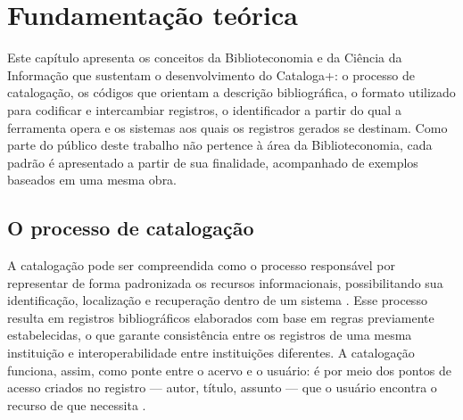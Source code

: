 %
%

\chapter{Fundamentação teórica}
\label{cap:fundamentacao}

Este capítulo apresenta os conceitos da Biblioteconomia e da Ciência da Informação que sustentam o desenvolvimento do Cataloga+: o processo de catalogação, os códigos que orientam a descrição bibliográfica, o formato utilizado para codificar e intercambiar registros, o identificador a partir do qual a ferramenta opera e os sistemas aos quais os registros gerados se destinam. Como parte do público deste trabalho não pertence à área da Biblioteconomia, cada padrão é apresentado a partir de sua finalidade, acompanhado de exemplos baseados em uma mesma obra.

\section{O processo de catalogação}
\label{sec:catalogacao}

A catalogação pode ser compreendida como o processo responsável por representar de forma padronizada os recursos informacionais, possibilitando sua identificação, localização e recuperação dentro de um sistema \cite{mey2009}. Esse processo resulta em registros bibliográficos elaborados com base em regras previamente estabelecidas, o que garante consistência entre os registros de uma mesma instituição e interoperabilidade entre instituições diferentes. A catalogação funciona, assim, como ponte entre o acervo e o usuário: é por meio dos pontos de acesso criados no registro --- autor, título, assunto --- que o usuário encontra o recurso de que necessita \cite{svenonius2000}.

